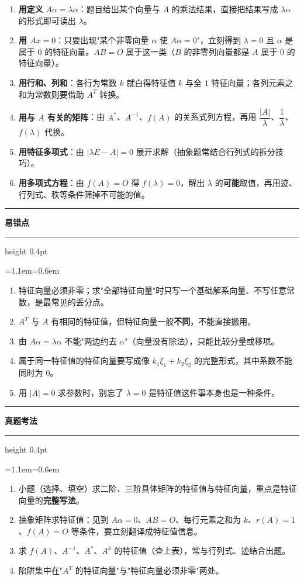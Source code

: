 \documentclass[11pt,openany,UTF8]{ctexbook}
\newcommand{\callouthead}[2]{%
  \par\addvspace{7pt}\noindent
  {\color{#1}\rule[-0.15em]{3pt}{1.05em}}\hspace{0.5em}%
  {\bfseries\color{#1}#2}\par\nobreak\vspace{-0.35em}%
  {\color{rulesep}\hrule height 0.4pt}\nobreak\vspace{0.45em}%
  \begingroup\small\setlength{\parindent}{0pt}%
  \leftskip=1.1em\rightskip=0.6em\noindent\ignorespaces}
\newcommand{\calloutend}{\par\endgroup\addvspace{7pt}}
\newenvironment{callwarn}[1]{\callouthead{warnbar}{#1}}{\calloutend}
\newenvironment{callexam}[1]{\callouthead{exambar}{#1}}{\calloutend}
\begin{document}
\begin{enumerate}
\item \textbf{用定义} $A\alpha=\lambda\alpha$：题目给出某个向量与 $A$ 的乘法结果，直接把结果写成 $\lambda\alpha$ 的形式即可读出 $\lambda$。
\item \textbf{用 $Ax=0$}：只要出现"某个非零向量 $\alpha$ 使 $A\alpha=0$"，立刻得到 $\lambda=0$ 且 $\alpha$ 是属于 $0$ 的特征向量。$AB=O$ 属于这一类（$B$ 的非零列向量都是 $A$ 属于 $0$ 的特征向量）。
\item \textbf{用行和、列和}：各行为常数 $k$ 就白得特征值 $k$ 与全 $1$ 特征向量；各列元素之和为常数则要借助 $A^T$ 转换。
\item \textbf{用与 $A$ 有关的矩阵}：由 $A^*$、$A^{-1}$、$f(A)$ 的关系式列方程，再用 $\dfrac{\vert A\vert}{\lambda}$、$\dfrac{1}{\lambda}$、$f(\lambda)$ 代换。
\item \textbf{用特征多项式}：由 $\vert\lambda E-A\vert=0$ 展开求解（抽象题常结合行列式的拆分技巧）。
\item \textbf{用多项式方程}：由 $f(A)=O$ 得 $f(\lambda)=0$，解出 $\lambda$ 的\textbf{可能}取值，再用迹、行列式、秩等条件筛掉不可能的值。
\end{enumerate}
\begin{callwarn}{易错点}
\begin{enumerate}
\item 特征向量必须非零；求"全部特征向量"时只写一个基础解系向量、不写任意常数，是最常见的丢分点。
\item $A^T$ 与 $A$ 有相同的特征值，但特征向量一般\textbf{不同}，不能直接搬用。
\item 由 $A\alpha=\lambda\alpha$ 不能"两边约去 $\alpha$"（向量没有除法），只能比较分量或移项。
\item 属于同一特征值的特征向量要写成像 $k_1\xi_1+k_2\xi_2$ 的完整形式，其中系数不能同时为 $0$。
\item 用 $\vert A\vert=0$ 求参数时，别忘了 $\lambda=0$ 是特征值这件事本身也是一种条件。
\end{enumerate}
\end{callwarn}

\begin{callexam}{真题考法}
\begin{enumerate}
\item 小题（选择、填空）求二阶、三阶具体矩阵的特征值与特征向量，重点是特征向量的\textbf{完整写法}。
\item 抽象矩阵求特征值：见到 $A\alpha=0$、$AB=O$、每行元素之和为 $k$、$r(A)=1$、$f(A)=O$ 等条件，要立刻翻译成特征值信息。
\item 求 $f(A)$、$A^{-1}$、$A^*$、$A^k$ 的特征值（查上表），常与行列式、迹结合出题。
\item 陷阱集中在"$A^T$ 的特征向量"与"特征向量必须非零"两处。
\end{enumerate}
\end{callexam}
\end{document}
